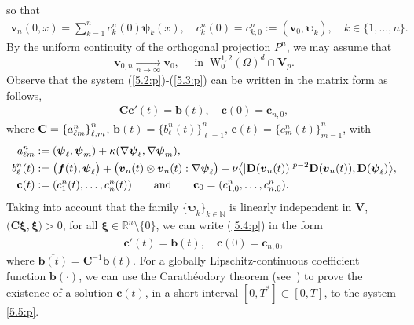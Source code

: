 \documentclass[12pt,reqno]{amsart}
\numberwithin{equation}{section}
\let\originalleft\left
\let\originalright\right
\renewcommand{\left}{\mathopen{}\mathclose\bgroup\originalleft}
\renewcommand{\right}{\aftergroup\egroup\originalright}
\theoremstyle{definition}
\def\W{\mathrm{W}}
\def\R{\mathbb{R}}
\def\vv{\boldsymbol{v}}
\def\f{\boldsymbol{f}}
\def\N{\mathbb{N}}
\def\bfb{\mathbf{b}}
\def\bfC{\mathbf{C}}
\def\bfV{\mathbf{V}}
\def\bfD{\mathbf{D}}
\def\bfb{\mathbf{b}}
\def\bfc{\mathbf{c}}
\def\bpsi{\boldsymbol{\psi}}
\def\bxi{\boldsymbol{\xi}}
\begin{document}
so that
		\begin{align*}
			\vv_n(0,x)=\sum_{k=1}^n c_k^n(0)\bpsi_k(x),\quad c_k^n(0)=c_{k,0}^n:=(\vv _{0},\bpsi_k),\quad k\in\{1,\dots,n\}.
		\end{align*}
By the uniform continuity of the orthogonal projection $P^n$, we may assume that
\begin{equation}\label{uniform:cont:p}
\vv_{0,n} \xrightarrow[n\to\infty]{} \vv_{0},\quad \text{ in }\ \W^{1,2}_0(\Omega)^d\cap\bfV_p.
\end{equation}
		Observe that the system (\ref{5.2:p})-(\ref{5.3:p}) can be written in the matrix form as follows,
		\begin{align}\label{5.4:p}
			\bfC \bfc'(t)=\bfb(t), \quad \bfc(0)=\bfc_{n,0},
		\end{align}
		where
		$\bfC=\left\{a^n_{\ell m}\right\}_{\ell,m}^n$, $\bfb(t)=\{b_{\ell}^n(t)\}_{\ell=1}^n$, $\bfc(t)=\{c_m^n(t)\}_{m=1}^n$,  with
		\begin{alignat*}{5}
			 a_{\ell m}^n&:=
			\left(\bpsi_{\ell},\bpsi_{m}\right)+\kappa\left(\nabla\bpsi_{\ell},\nabla\bpsi_{m}\right), \\
			 b_{\ell}^n(t)&:=
			\big(\f(t),\bpsi_{\ell}\big) + \big(\vv_n(t)\otimes\vv_n(t):\nabla\bpsi_{\ell}\big)
			-\nu\big<|\bfD(\vv_n(t))|^{p-2}\bfD(\vv_n(t)),\bfD(\bpsi_{\ell})\big>, \\
			 \bfc(t)&:=(c_{1}^n(t),\dots,c_{n}^n(t))\qquad\mbox{and}\qquad
			\bfc_{0}={(c_{1,0}^n,\dots,c_{n,0}^n)}.
		\end{alignat*}
Taking into account that the family $\big\{\bpsi_{k}\big\}_{k\in\N}$ is linearly independent in $\bfV$,
		$\big(\bfC\bxi,\bxi\big)>0$, for all $\bxi\in\R^n\setminus\{0\}$, we can write (\ref{5.4:p}) in the form
		\begin{align}\label{5.5:p}
			\bfc'(t)=\overline{\bfb(t)}, \quad \bfc(0)=\bfc_{n,0},
		\end{align}
where $\overline{\bfb(t)}=\bfC^{-1}\bfb(t)$.
For a globally Lipschitz-continuous coefficient function $\bfb(\cdot)$, we can use the Carathéodory theorem (see~\cite[Theorem~A.3.4]{Necas:book:1996}) to prove the existence of a solution $\bfc(t)$, in a short interval $[0,T^\ast]\subset[0,T]$, to the system \eqref{5.5:p}.
\end{document}
